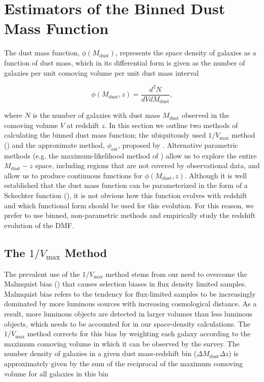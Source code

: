 \section{Estimators of the Binned Dust Mass Function}
\label{sec:dmf_estimators}

The dust mass function, $\phi(M_{\textrm{dust}})$, represents the space density of galaxies as a function of dust mass, which in its differential form is given as the number of galaxies per unit comoving volume per unit dust mass interval

\begin{equation}
    \phi(M_{\textrm{dust}}, z) = \frac{d^2N}{dV dM_{\textrm{dust}}},
\label{eq:differential_phi}
\end{equation}

\noindent where $N$ is the number of galaxies with dust mass $M_{\textrm{dust}}$ observed in the comoving volume $V$ at redshift $z$. In this section we outline two methods of calculating the binned dust mass function; the ubiquitously used $1/V_{\textrm{max}}$ method \mbox{(\citealt{Schmidt_1968, Felten_1976, Avni_1980})} and the approximate method, $\phi_{\textrm{est}}$, proposed by \citealt{Page_2000}. Alternative parametric methods (e.g. the maximum-likelihood method of \citealt{Marshall_1983}) allow us to explore the entire $M_{\textrm{dust}} - z$ space, including regions that are not covered by observational data, and allow us to produce continuous functions for $\phi(M_{\textrm{dust}}, z)$. Although it is well established that the dust mass function can be parameterized in the form of a Schechter function (\citealt{Press_1974, Schechter_1976}), it is not obvious how this function evolves with redshift and which functional form should be used for this evolution. For this reason, we prefer to use binned, non-parametric methods and empirically study the redshift evolution of the DMF.

\subsection{The $1/V_{\textrm{max}}$ Method}

The prevalent use of the $1/V_{\textrm{max}}$ method stems from our need to overcome the Malmquist bias (\citealt{Eddington_1914, Malmquist_1922}) that causes selection biases in flux density limited samples. Malmquist bias refers to the tendency for flux-limited samples to be increasingly dominated by more luminous sources with increasing cosmological distance. As a result, more luminous objects are detected in larger volumes than less luminous objects, which needs to be accounted for in our space-density calculations. The $1/V_{\textrm{max}}$ method corrects for this bias by weighting each galaxy according to the maximum comoving volume in which it can be observed by the survey. The number density of galaxies in a given dust mass-redshift bin ($\Delta M_{\textrm{dust}} \Delta z$) is approximately given by the sum of the reciprocal of the maximum comoving volume for all galaxies in this bin


